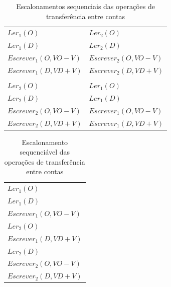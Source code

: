 \documentclass[11pt,twoside,a4paper]{book}
\begin{document}
\begin{table}
\caption{Escalonamentos sequenciais das operações de transferência entre contas}
\label{tab:escalonamento_sequencial}
\centering
\begin{tabular}{ | l | l | }
	\hline
	$Ler_1(O)$&$Ler_2(O)$\\
	$Ler_1(D)$&$Ler_2(D)$\\
	$Escrever_1(O, VO - V)$&$Escrever_2(O, VO - V)$\\
	$Escrever_1(D, VD + V)$&$Escrever_2(D, VD + V)$\\
	&\\
	$Ler_2(O)$&$Ler_1(O)$\\
	$Ler_2(D)$&$Ler_1(D)$\\
	$Escrever_2(O, VO - V)$&$Escrever_1(O, VO - V)$\\
	$Escrever_2(D, VD + V)$&$Escrever_1(D, VD + V)$\\
	\hline
\end{tabular}
\end{table}

\begin{table}
\caption{Escalonamento sequenciável das operações de transferência entre contas}
\label{tab:escalonamento_sequenciavel}
\centering
\begin{tabular}{ | l | }
	\hline
	$Ler_1(O)$\\
	$Ler_1(D)$\\
	$Escrever_1(O, VO - V)$\\
	$Ler_2(O)$\\
	$Escrever_1(D, VD + V)$\\
	$Ler_2(D)$\\
	$Escrever_2(O, VO - V)$\\
	$Escrever_2(D, VD + V)$\\
	\hline
\end{tabular}
\end{table}

\end{document}

